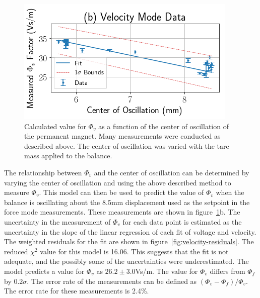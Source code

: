 \documentclass[aps,prstab,reprint,12pt]{revtex4-1}
\begin{document}
\begin{figure}[b]
    \centering
    \includegraphics[width=\linewidth]{figs/data/velocity_data.png}
    \caption{Calculated value for $\Phi_v$ as a function of the center of oscillation of the permanent magnet. Many measurements were conducted as described above. The center of oscillation was varied with the tare mass applied to the balance.}
    \label{fig:velocity-data}
\end{figure}

The relationship between $\Phi_v$ and the center of oscillation can be determined by varying the center of oscillation and using the above described method to measure $\Phi_v$. This model can then be used to predict the value of $\Phi_v$ when the balance is oscillating about the 8.5mm displacement used as the setpoint in the force mode measurements. These measurements are shown in figure~\ref{fig:velocity-data}b. The uncertainty in the measurement of $\Phi_v$ for each data point is estimated as the uncertainty in the slope of the linear regression of each fit of voltage and velocity. The weighted residuals for the fit are shown in figure~\ref{fig:velocity-residuals}. The reduced $\chi^2$ value for this model is 16.06. This suggests that the fit is not adequate, and the possibly some of the uncertainties were underestimated. The model predicts a value for $\Phi_v$ as $26.2 \pm 3.0$\si{Vs/m}. The value for $\Phi_v$ differs from $\Phi_f$ by $0.2\sigma$. The error rate of the measurements can be defined as $(\Phi_v-\Phi_f)/\Phi_v$. The error rate for these measurements is 2.4\%.
\end{document}
